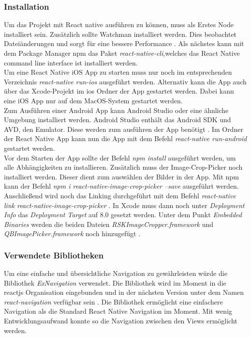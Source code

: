         \subsubsection{Installation}
Um das Projekt mit React native ausführen zu können, muss als Erstes Node installiert sein. Zusätzlich sollte Watchman installiert werden. Dies beobachtet Dateiänderungen und sorgt für eine bessere Performance \cite{facebook_inc._start_2017}.  Als nächstes kann mit dem Package Manager npm das Paket \textit{react-native-cli},welches das  React Native command line interface ist installiert werden. \\

Um eine React Native iOS App zu starten muss nur noch im entsprechenden Verzeichnis \textit{react-native run-ios} ausgeführt werden. Alternativ kann die App auch über das Xcode-Projekt im ios Ordner der App gestartet werden. Dabei kann eine iOS App nur auf dem MacOS-System gestartet werden. \cite{facebook_inc._start_2017}\\

Zum Ausführen einer Android App kann Android Studio oder eine ähnliche Umgebung installiert werden. Android Studio enthält das Android SDK und AVD, den Emulator. Diese werden zum ausführen der App benötigt \cite{facebook_inc._start_2017}. Im Ordner der React Native App kann nun die App mit dem Befehl \textit{react-native run-android} gestartet werden. \\

Vor dem Starten der App sollte der Befehl \textit{npm install} ausgeführt werden, um alle Abhängigkeiten zu installieren. Zusätzlich muss der Image-Crop-Picker noch installiert werden. Dieser dient zum auswählen der Bilder in der App. Mit npm kann der Befehl \textit{npm i react-native-image-crop-picker --save} ausgeführt werden. Anschließend wird noch das Linking durchgeführt mit dem Befehl \textit{react-native link react-native-image-crop-picker} \cite{pusic_crop_2017}. In Xcode muss dann noch unter \textit{Deployment Info} das \textit{Deployment Target} auf 8.0 gesetzt werden. Unter dem Punkt \textit{Embedded Binaries} werden die beiden Dateien \textit{RSKImageCropper.framework} und \textit{QBImagePicker.framework} noch hinzugefügt \cite{pusic_crop_2017}. 

        \subsubsection{Verwendete Bibliotheken}
Um eine einfache und übersichtliche  Navigation zu gewährleisten würde die Bibliothek \textit{ExNavigation} verwendet. Die Bibliothek wird im Moment in die reactjs Organisation eingebunden und in der nächsten Version unter dem Namen \textit{react-navigation} verfügbar sein \cite{Vatne_exnavigation_2017}. Die Bibliothek ermöglicht eine einfachere Navigation als die Standard React Native Navigation im Moment. Mit wenig Entwicklungsaufwand konnte so die Navigation zwischen den Views ermöglicht werden. \\



